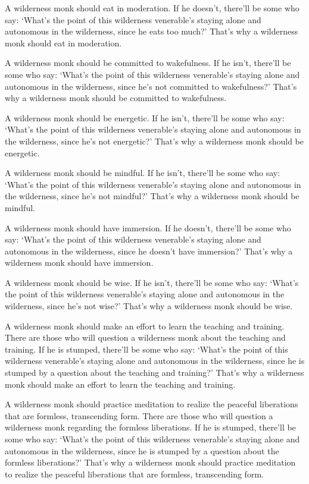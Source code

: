 \documentclass[12pt,openany]{book}%
\begin{document}
A wilderness monk should eat in moderation. If he doesn’t, there’ll be some who say: ‘What’s the point of this wilderness venerable’s staying alone and autonomous in the wilderness, since he eats too much?’ That’s why a wilderness monk should eat in moderation. 

A wilderness monk should be committed to wakefulness. If he isn’t, there’ll be some who say: ‘What’s the point of this wilderness venerable’s staying alone and autonomous in the wilderness, since he’s not committed to wakefulness?’ That’s why a wilderness monk should be committed to wakefulness. 

A wilderness monk should be energetic. If he isn’t, there’ll be some who say: ‘What’s the point of this wilderness venerable’s staying alone and autonomous in the wilderness, since he’s not energetic?’ That’s why a wilderness monk should be energetic. 

A wilderness monk should be mindful. If he isn’t, there’ll be some who say: ‘What’s the point of this wilderness venerable’s staying alone and autonomous in the wilderness, since he’s not mindful?’ That’s why a wilderness monk should be mindful. 

A wilderness monk should have immersion. If he doesn’t, there’ll be some who say: ‘What’s the point of this wilderness venerable’s staying alone and autonomous in the wilderness, since he doesn’t have immersion?’ That’s why a wilderness monk should have immersion. 

A wilderness monk should be wise. If he isn’t, there’ll be some who say: ‘What’s the point of this wilderness venerable’s staying alone and autonomous in the wilderness, since he’s not wise?’ That’s why a wilderness monk should be wise. 

A wilderness monk should make an effort to learn the teaching and training. There are those who will question a wilderness monk about the teaching and training. If he is stumped, there’ll be some who say: ‘What’s the point of this wilderness venerable’s staying alone and autonomous in the wilderness, since he is stumped by a question about the teaching and training?’ That’s why a wilderness monk should make an effort to learn the teaching and training. 

A wilderness monk should practice meditation to realize the peaceful liberations that are formless, transcending form. There are those who will question a wilderness monk regarding the formless liberations. If he is stumped, there’ll be some who say: ‘What’s the point of this wilderness venerable’s staying alone and autonomous in the wilderness, since he is stumped by a question about the formless liberations?’ That’s why a wilderness monk should practice meditation to realize the peaceful liberations that are formless, transcending form. 
\end{document}
